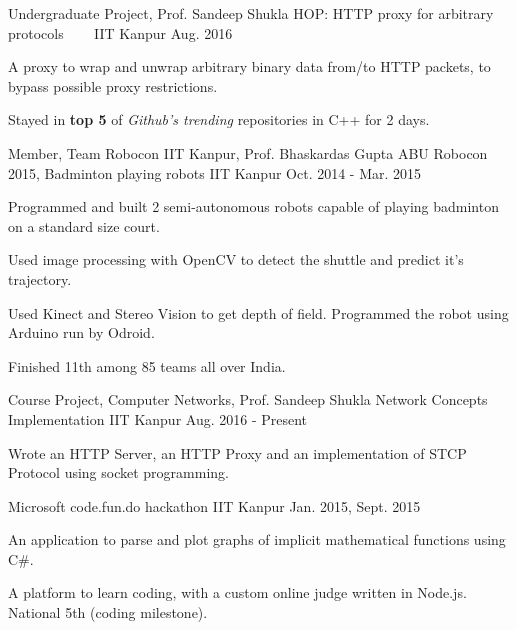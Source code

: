 \begin{cventries}
  \cventry
  {Undergraduate Project, Prof. Sandeep Shukla}
  {HOP: HTTP proxy for arbitrary protocols
    \ \ \ }
  {IIT Kanpur}
  {Aug. 2016}
  {
    \begin{cvitems}
    \item A proxy to wrap and unwrap arbitrary binary data from/to
      HTTP packets, to bypass possible proxy restrictions.
    \item Stayed in \textbf{top 5} of \textit{Github's trending}
      repositories in C++ for 2 days.
    \end{cvitems}
  }

  \cventry
  {Member, Team Robocon IIT Kanpur, Prof. Bhaskardas Gupta}
  {ABU Robocon 2015, Badminton playing robots}
  {IIT Kanpur}
  {Oct. 2014 - Mar. 2015}
  {
    \begin{cvitems}
    \item Programmed and built 2 semi-autonomous robots
      capable of playing badminton on a standard size court.
    \item Used image processing with OpenCV to detect the shuttle
      and predict it's trajectory.
    \item Used Kinect and Stereo Vision to get depth of
      field. Programmed the robot using Arduino run by Odroid.
    \item Finished 11th among 85 teams all over India.
    \end{cvitems}
  }

  \cventry
  {Course Project, Computer Networks, Prof. Sandeep Shukla}
  {Network Concepts Implementation}
  {IIT Kanpur}
  {Aug. 2016 - Present}
  {
    \begin{cvitems}
    \item Wrote an HTTP Server, an HTTP Proxy and an implementation of
      STCP Protocol using socket programming.
    \end{cvitems}
  }


  {Microsoft code.fun.do hackathon}
  {IIT Kanpur}
  {Jan. 2015, Sept. 2015}
  {
    \begin{cvitems}
    \item An application to parse and plot graphs of implicit
      mathematical functions using C\#.
    \item A platform to learn coding, with a
      custom online judge written in Node.js. National 5th (coding milestone).
    \end{cvitems}
  }

\end{cventries}

